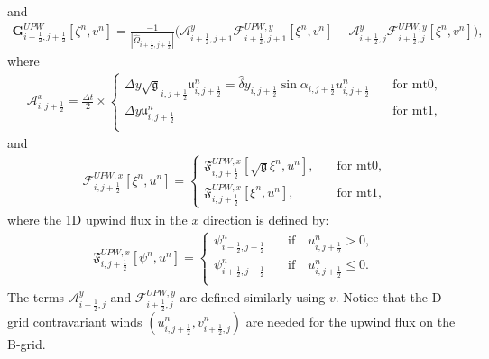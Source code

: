 and
\begin{align}
	\mathbf{G}_{i+\frac{1}{2},j+\frac{1}{2}}^{UPW}[{\zeta^n,v^{n}}] = 
	\frac{-1}{|\hat{\Omega}_{i+\frac{1}{2},j+\frac{1}{2}}|}
	\bigg(\mathcal{A}_{i+\frac{1}{2},j+1}^{y} \mathcal{F}_{i+\frac{1}{2},j+1}^{UPW,y}[\xi^n,{v}^{n}]-
          \mathcal{A}_{i+\frac{1}{2},j  }^{y} \mathcal{F}_{i+\frac{1}{2},j  }^{UPW,y}[\xi^n,{v}^{n}] \bigg),
\end{align}
where
\begin{align}
	\mathcal{A}_{i,j+\frac{1}{2}}^{x} = \frac{\Delta t}{2} \times
	\begin{cases}
		\Delta y
		\sqrt{\mathfrak{g}}_{i,j+\frac{1}{2}}
		\mathfrak{u}_{i,j+\frac{1}{2}}^n=
		\hat{\delta} y_{i,j+\frac{1}{2}}
		\sin{\alpha_{i,j+\frac{1}{2}}}
		{u}_{i,j+\frac{1}{2}}^n
		\quad &
		\text{for mt0},\\
		\Delta y
		\mathfrak{u}_{i,j+\frac{1}{2}}^n
		\quad &
		\text{for mt1},\\
	\end{cases}
\end{align}
and
\begin{align}
	\mathcal{F}_{i,j+\frac{1}{2}}^{UPW,x} [{\xi}^n,u^n]= 
	\begin{cases}
		\mathfrak{F}_{i,j+\frac{1}{2}}^{UPW,x}[{{\sqrt{\mathfrak{g}}\xi}^n},u^n],
		\quad &\text{for mt0},\\
		\mathfrak{F}_{i,j+\frac{1}{2}}^{UPW,x}[{\xi}^n,u^n],
		\quad &\text{for mt1},
	\end{cases}
\end{align}
where the 1D upwind flux in the $x$ direction is defined by:
\begin{align}
	\mathfrak{F}_{i,j+\frac{1}{2}}^{UPW,x} [{{\psi}^n},u^n]=
	\begin{cases}
		{\psi}_{i-\frac{1}{2},j+\frac{1}{2}}^n
		\quad &\text{if} \quad 
		{u}_{i,j+\frac{1}{2}}^{n}>0,\\
		{\psi}_{i+\frac{1}{2},j+\frac{1}{2}}^n
		\quad &\text{if} \quad 
		{u}_{i,j+\frac{1}{2}}^{n}\leq0.\\
	\end{cases}
\end{align}
The terms $\mathcal{A}_{i+\frac{1}{2},j}^{y}$ and	$\mathcal{F}_{i+\frac{1}{2},j}^{UPW,y}$ are defined similarly using $v$.
Notice that the D-grid contravariant winds $(u_{i,j+\frac{1}{2}}^n,v_{i+\frac{1}{2},j}^n)$ are needed for the upwind flux on the B-grid.

